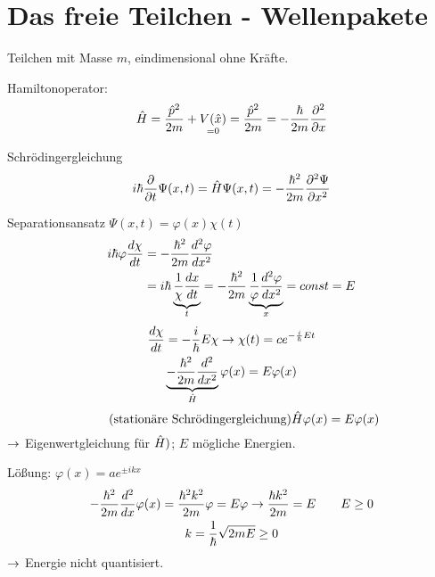 \section{Das freie Teilchen - Wellenpakete} %
\label{sec:Das_freie_Teilchen_-_Wellenpakete}
Teilchen mit Masse $m$, eindimensional ohne Kräfte.
\begin{erl}{Hamiltonoperator:}
     \begin{equation*}
         \hat{H}=\frac{\hat{p}^2}{2m}+\underset{=0}{V(\hat{x})}=\frac{\hat{p}^2}{2m}= -
         \frac{\hbar}{2m}\frac{\partial^2}{\partial x}
     \end{equation*}
\end{erl}
\begin{erl}{Schrödingergleichung}
      \begin{equation*}
          i \hbar \frac{\partial}{\partial t} \Psi(x,t) = \hat{H} \Psi(x,t) =
          -\frac{\hbar^2}{2m}\frac{\partial^2 \Psi}{\partial x^2}
      \end{equation*}
\end{erl}
Separationsansatz $\Psi(x,t) = \varphi(x) \chi(t)$
\begin{align*}
    i \hbar \varphi \frac{d \chi}{d t} &= -\frac{\hbar^2}{2m} \frac{d^2
    \varphi}{dx^2 } \\
    &=
    i \hbar \underbrace{\frac{1}{\chi}\frac{d x}{d t}}_{t}
    =
    - \frac{\hbar^2}{2m} \underbrace{\frac{1}{\varphi} \frac{d^2
    \varphi}{dx^2}}_{x}
    = const = E
\end{align*}
\begin{gather*}
     \frac{d \chi }{dt}=- \frac{i}{\hbar} E \chi \rightarrow \chi(t) = c
     e^{-\frac{i}{\hbar}E t} \\
     \underbrace{-\frac{\hbar^2}{2m}\frac{d^2}{dx^2}}_{\hat{H}}\varphi(x) = E \varphi(x)
\end{gather*}
\begin{equation*}
    \tag*{\text{(stationäre Schrödingergleichung)}}
    \h{H} \varphi(x) = E \varphi(x)
\end{equation*}
$\rightarrow$ Eigenwertgleichung für $\hat{H})$; $E$ mögliche Energien.

Lößung: $\varphi(x) = a e^{\pm ikx}$
\begin{gather*}
    - \frac{\hbar^2}{2m} \frac{d ^2}{d x} \varphi(x)
    =
    \frac{\hbar^2 k^2}{2m} \varphi = E \varphi
    \rightarrow \frac{\hbar k^2}{2m} = E \qquad E \geq 0 \\
    k = \frac{1}{\hbar} \sqrt{ 2m E} \geq 0
\end{gather*}
$\rightarrow$ Energie nicht quantisiert.

